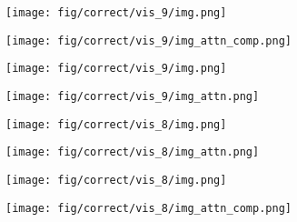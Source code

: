 \documentclass{article} \usepackage[dvipsnames,table]{xcolor}
\begin{document}
\begin{figure}[t]

\centering
    \begin{minipage}[t]{0.47\linewidth}
        \begin{minipage}{0.47\linewidth}
            \centering
            \texttt{[image: fig/correct/vis\_9/img.png]}
        \end{minipage}
        \begin{minipage}{0.47\linewidth}
            \centering
            \texttt{[image: fig/correct/vis\_9/img\_attn\_comp.png]}
        \end{minipage}
    \end{minipage}
    \begin{minipage}[t]{0.47\linewidth}
        \begin{minipage}{0.47\linewidth}
            \centering
            \texttt{[image: fig/correct/vis\_9/img.png]}
        \end{minipage}
        \begin{minipage}{0.47\linewidth}
            \centering
            \texttt{[image: fig/correct/vis\_9/img\_attn.png]}
        \end{minipage}
    \end{minipage}
    
    \centering
    \begin{minipage}[t]{0.47\linewidth}
        \centering
        
    \end{minipage}
    \begin{minipage}[t]{0.47\linewidth}
        \centering
        
    \end{minipage}
    
\centering
    \begin{minipage}[t]{0.47\linewidth}
        \begin{minipage}{0.47\linewidth}
            \centering
            \texttt{[image: fig/correct/vis\_8/img.png]}
        \end{minipage}
        \begin{minipage}{0.47\linewidth}
            \centering
            \texttt{[image: fig/correct/vis\_8/img\_attn.png]}
        \end{minipage}
    \end{minipage}
    \begin{minipage}[t]{0.47\linewidth}
        \begin{minipage}{0.47\linewidth}
            \centering
            \texttt{[image: fig/correct/vis\_8/img.png]}
        \end{minipage}
        \begin{minipage}{0.47\linewidth}
            \centering
            \texttt{[image: fig/correct/vis\_8/img\_attn\_comp.png]}
        \end{minipage}
    \end{minipage}
    

\end{figure}
\end{document}
